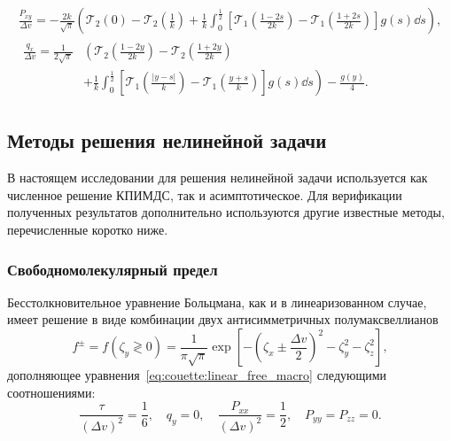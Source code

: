 \begin{gather}
    \frac{P_{xy}}{\Delta v} = -\frac{2k}{\sqrt{\pi}} \left(
        \mathcal{T}_2(0)-\mathcal{T}_2\left(\frac1k\right)
        + \frac1k\int_0^{\frac12}\left[
            \mathcal{T}_1\left(\frac{1-2s}{2k}\right)-\mathcal{T}_1\left(\frac{1+2s}{2k}\right)
        \right]g(s)\dd{s}
        \right), \label{eq:couette:bkw_macro_Pxy} \\
    \begin{aligned}
    \frac{q_x}{\Delta v} = \frac1{2\sqrt{\pi}}&\left(
        \mathcal{T}_2\left(\frac{1-2y}{2k}\right) - \mathcal{T}_2\left(\frac{1+2y}{2k}\right)\right. \\
        &+\left. \frac1k\int_0^{\frac12}\left[
            \mathcal{T}_1\left(\frac{|y-s|}k\right)-\mathcal{T}_1\left(\frac{y+s}k\right)
        \right]g(s)\dd{s}
        \right) - \frac{g(y)}4.
    \end{aligned} \label{eq:couette:bkw_macro_qx}
\end{gather}

\subsection{Методы решения нелинейной задачи}

В настоящем исследовании для решения нелинейной задачи используется как численное решение КПИМДС,
так и асимптотическое.
Для верификации полученных результатов дополнительно используются другие известные методы,
перечисленные коротко ниже.

\subsubsection{Свободномолекулярный предел}

Бесстолкновительное уравнение Больцмана, как и в линеаризованном случае,
имеет решение в виде комбинации двух антисимметричных полумаксвеллианов
\begin{equation}\label{eq:couette:free_solution}
    f^\pm = f(\zeta_y \gtrless 0) =
        \frac1{\pi\sqrt{\pi}} \exp\left[-\left(\zeta_x\pm\frac{\Delta{v}}2\right)^2 - \zeta_y^2 - \zeta_z^2\right],
\end{equation}
дополняющее уравнения~\eqref{eq:couette:linear_free_macro} следующими соотношениями:
\begin{equation}\label{eq:couette:free_macro}
    \frac{\tau}{(\Delta{v})^2} = \frac16, \quad q_y = 0, \quad
    \frac{P_{xx}}{(\Delta{v})^2} = \frac12, \quad P_{yy} = P_{zz} = 0.
\end{equation}

